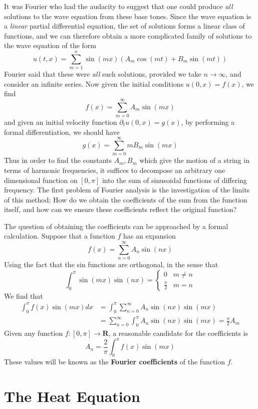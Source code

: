 It was Fourier who had the audacity to suggest that one could produce {\it all} solutions to the wave equation from these base tones. Since the wave equation is a {\it linear} partial differential equation, the set of solutions forms a linear class of functions, and we can therefore obtain a more complicated family of solutions to the wave equation of the form
%
\[ u(t,x) = \sum_{m = 1}^n \sin(mx) (A_m \cos(mt) + B_m \sin(mt)) \]
%
Fourier said that these were {\it all} such solutions, provided we take $n \to \infty$, and consider an infinite series. Now given the initial conditions $u(0,x) = f(x)$, we find
%
\[ f(x) = \sum_{m = 0}^\infty A_m \sin(mx) \]
%
and given an initial velocity function $\partial_t u(0,x) = g(x)$, by performing a formal differentiation, we should have
%
\[ g(x) = \sum_{m = 0}^\infty m B_m \sin(mx) \]
%
Thus in order to find the constants $A_m,B_m$ which give the motion of a string in terms of harmonic frequencies, it suffices to decompose an arbitrary one dimensional function on $[0,\pi]$ into the sum of sinusoidal functions of differing frequency. The first problem of Fourier analysis is the investigation of the limits of this method; How do we obtain the coefficients of the sum from the function itself, and how can we ensure these coefficients reflect the original function?

The question of obtaining the coefficients can be approached by a formal calculation. Suppose that a function $f$ has an expansion
%
\[ f(x) = \sum_{n = 0}^\infty A_n \sin(nx) \]
%
Using the fact that the sin functions are orthogonal, in the sense that
%
\[ \int_0^\pi \sin(mx) \sin(nx) = \begin{cases} 0 & m \neq n \\ \frac{\pi}{2} & m = n \end{cases} \]
%
We find that
%
\begin{align*}
    \int_0^\pi f(x) \sin(mx) dx &= \int_0^\pi \sum_{n = 0}^\infty A_n \sin(nx) \sin(mx)\\
    &= \sum_{n = 0}^\infty \int_0^\pi A_n \sin(nx) \sin(mx) = \frac{\pi}{2} A_m
\end{align*}
%
Given any function $f:[0,\pi] \to \mathbf{R}$, a reasonable candidate for the coefficients is
%
\[ A_n = \frac{2}{\pi} \int_0^\pi f(x) \sin(mx) \]
%
These values will be known as the {\bf Fourier coefficients} of the function $f$.

\section{The Heat Equation}

